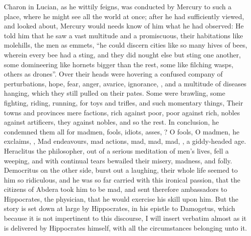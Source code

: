 Charon in Lucian, as he wittily feigns, was conducted by
Mercury to such a place, where he might see all the world at once; after he had
sufficiently viewed, and looked about, Mercury would needs know of him what he
had observed: He told him that he saw a vast multitude and a promiscuous, their
habitations like molehills, the men as emmets, \enquote{he could discern cities like so
many hives of bees, wherein every bee had a sting, and they did nought else but
sting one another, some domineering like hornets bigger than the rest, some
like filching wasps, others as drones}. Over their heads were hovering a
confused company of perturbations, hope, fear, anger, avarice, ignorance,
\etc{}, and a multitude of diseases hanging, which they still pulled on their
pates. Some were brawling, some fighting, riding, running,  for toys and trifles, and such momentary things,
Their towns and provinces mere factions, rich against poor, poor against rich,
nobles against artificers, they against nobles, and so the rest. In conclusion,
he condemned them all for madmen, fools, idiots, asses, ? O fools, O madmen, he exclaims, , \etc{} Mad endeavours, mad actions, mad, mad, mad,
, a giddy-headed age.
Heraclitus the philosopher, out of a serious meditation of men's lives, fell a
weeping, and with continual tears bewailed their misery, madness, and folly.
Democritus on the other side, burst out a laughing, their whole life seemed to
him so ridiculous, and he was so far carried with this ironical passion, that
the citizens of Abdera took him to be mad, and sent therefore ambassadors to
Hippocrates, the physician, that he would exercise his skill upon him. But the
story is set down at large by Hippocrates, in his epistle to Damogetus, which
because it is not impertinent to this discourse, I will insert verbatim almost
as it is delivered by Hippocrates himself, with all the circumstances belonging
unto it.

